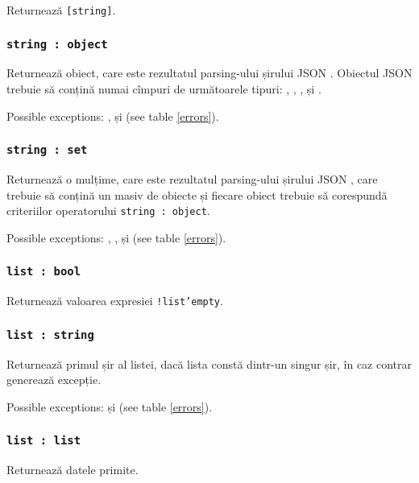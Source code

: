 Returnează \texttt{[string]}.

\subsubsection{\texttt{string : object}}

Returnează obiect, care este rezultatul parsing-ului șirului JSON \str. Obiectul JSON trebuie să conțină numai cîmpuri de următoarele tipuri: \bool, \integer, \double, \str{} și \listtype.

Possible exceptions: ,  și  (see table \ref{errors}).

\subsubsection{\texttt{string : set}}

Returnează o mulțime, care este rezultatul parsing-ului șirului JSON \str, care trebuie să conțină un masiv de obiecte și fiecare obiect trebuie să corespundă criteriilor operatorului \texttt{string : object}.

Possible exceptions: , ,  și  (see table \ref{errors}).

\subsubsection{\texttt{list : bool}}

Returnează valoarea expresiei \texttt{!list'empty}.

\subsubsection{\texttt{list : string}}

Returnează primul șir al listei, dacă lista constă dintr-un singur șir, în caz contrar generează excepție.

Possible exceptions:  și  (see table \ref{errors}).

\subsubsection{\texttt{list : list}}

Returnează datele primite.

